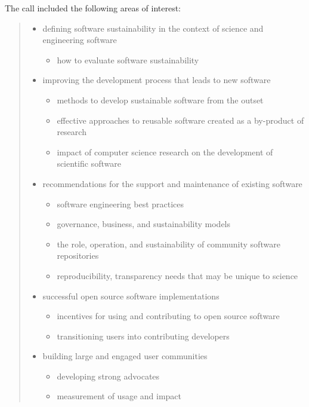 \documentclass[11pt, oneside]{amsart}
\begin{document}
The call included the following areas of interest:
\begin{quote}
\begin{itemize}
\renewcommand{\labelenumi}{\textbf{\theenumi}.}
\setlength{\rightmargin}{1em}
\item defining software sustainability in the context of science and engineering
software
\begin{itemize}
\item how to evaluate software sustainability
\end{itemize}

\item improving the development process that leads to new software
\begin{itemize}
\item methods to develop sustainable software from the outset
\item effective approaches to reusable software created as a by-product of
research
\item impact of computer science research on the development of scientific
software
\end{itemize}

\item recommendations for the support and maintenance of existing software
\begin{itemize}
\item software engineering best practices
\item governance, business, and sustainability models
\item the role, operation, and
sustainability of community software repositories
\item reproducibility, transparency needs that may be unique to science
\end{itemize}

\item successful open source software implementations
\begin{itemize}
\item incentives for using and contributing to open source software
\item transitioning users into contributing developers
\end{itemize}

\item building large and engaged user communities
\begin{itemize}
\item developing strong advocates
\item measurement of usage and impact
\end{itemize}


\end{itemize}
\end{quote}
\end{document}
